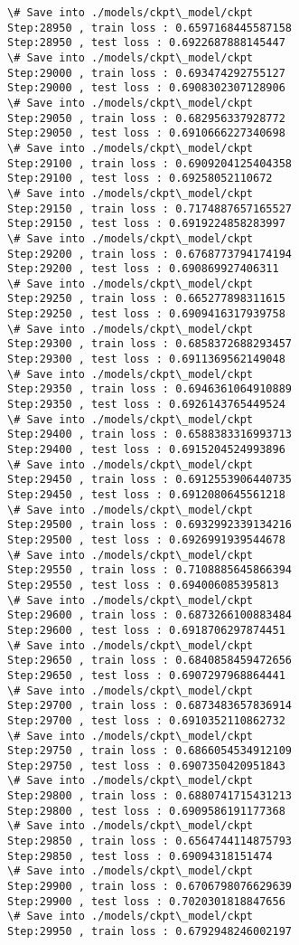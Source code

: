 \documentclass[11pt]{article}
\begin{document}
\begin{Verbatim}[commandchars=\\\{\}]
\# Save into ./models/ckpt\_model/ckpt
Step:28950 , train loss : 0.6597168445587158
Step:28950 , test loss : 0.6922687888145447
\# Save into ./models/ckpt\_model/ckpt
Step:29000 , train loss : 0.693474292755127
Step:29000 , test loss : 0.6908302307128906
\# Save into ./models/ckpt\_model/ckpt
Step:29050 , train loss : 0.682956337928772
Step:29050 , test loss : 0.6910666227340698
\# Save into ./models/ckpt\_model/ckpt
Step:29100 , train loss : 0.6909204125404358
Step:29100 , test loss : 0.69258052110672
\# Save into ./models/ckpt\_model/ckpt
Step:29150 , train loss : 0.7174887657165527
Step:29150 , test loss : 0.6919224858283997
\# Save into ./models/ckpt\_model/ckpt
Step:29200 , train loss : 0.6768773794174194
Step:29200 , test loss : 0.690869927406311
\# Save into ./models/ckpt\_model/ckpt
Step:29250 , train loss : 0.665277898311615
Step:29250 , test loss : 0.6909416317939758
\# Save into ./models/ckpt\_model/ckpt
Step:29300 , train loss : 0.6858372688293457
Step:29300 , test loss : 0.6911369562149048
\# Save into ./models/ckpt\_model/ckpt
Step:29350 , train loss : 0.6946361064910889
Step:29350 , test loss : 0.6926143765449524
\# Save into ./models/ckpt\_model/ckpt
Step:29400 , train loss : 0.6588383316993713
Step:29400 , test loss : 0.6915204524993896
\# Save into ./models/ckpt\_model/ckpt
Step:29450 , train loss : 0.6912553906440735
Step:29450 , test loss : 0.6912080645561218
\# Save into ./models/ckpt\_model/ckpt
Step:29500 , train loss : 0.6932992339134216
Step:29500 , test loss : 0.6926991939544678
\# Save into ./models/ckpt\_model/ckpt
Step:29550 , train loss : 0.7108885645866394
Step:29550 , test loss : 0.694006085395813
\# Save into ./models/ckpt\_model/ckpt
Step:29600 , train loss : 0.6873266100883484
Step:29600 , test loss : 0.6918706297874451
\# Save into ./models/ckpt\_model/ckpt
Step:29650 , train loss : 0.6840858459472656
Step:29650 , test loss : 0.6907297968864441
\# Save into ./models/ckpt\_model/ckpt
Step:29700 , train loss : 0.6873483657836914
Step:29700 , test loss : 0.6910352110862732
\# Save into ./models/ckpt\_model/ckpt
Step:29750 , train loss : 0.6866054534912109
Step:29750 , test loss : 0.6907350420951843
\# Save into ./models/ckpt\_model/ckpt
Step:29800 , train loss : 0.6880741715431213
Step:29800 , test loss : 0.6909586191177368
\# Save into ./models/ckpt\_model/ckpt
Step:29850 , train loss : 0.6564744114875793
Step:29850 , test loss : 0.69094318151474
\# Save into ./models/ckpt\_model/ckpt
Step:29900 , train loss : 0.6706798076629639
Step:29900 , test loss : 0.7020301818847656
\# Save into ./models/ckpt\_model/ckpt
Step:29950 , train loss : 0.6792948246002197

\end{Verbatim}
\end{document}

